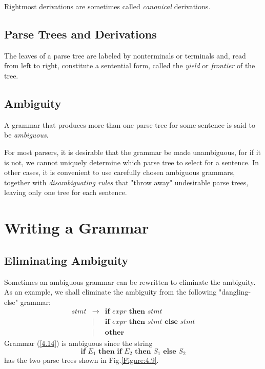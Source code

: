 \documentclass[a4paper,twoside]{book}
\begin{document}
Rightmost derivations are sometimes called \textit{canonical} derivations.

\subsection{Parse Trees and Derivations}

The leaves of a parse tree are labeled by nonterminals or terminals and, read from left to right, constitute a sentential form, called the \textit{yield} or \textit{frontier} of the tree.

\subsection{Ambiguity}

A grammar that produces more than one parse tree for some sentence is said to be \textit{ambiguous}.

For most parsers, it is desirable that the grammar be made unambiguous, for if it is not, we cannot uniquely determine which parse tree to select for a sentence. In other cases, it is convenient to use carefully chosen ambiguous grammars, together with \textit{disambiguating rules} that "throw away" undesirable parse trees, leaving only one tree for each sentence.

\section{Writing a Grammar}
\subsection{Eliminating Ambiguity}

Sometimes an ambiguous grammar can be rewritten to eliminate the ambiguity. As an example, we shall eliminate the ambiguity from the following "dangling-else" grammar:
\begin{equation}
    \begin{array}{ccl}stmt&\rightarrow&\textbf{if }expr\textbf{ then }stmt\\&|&\textbf{if }expr\textbf{ then }stmt\textbf{ else }stmt\\&|&\textbf{other}\end{array}
    \label{4.14}
\end{equation}
Grammar (\ref{4.14}) is ambiguous since the string
\begin{equation}
    \textbf{if }E_1\textbf{ then if }E_2\textbf{ then }S_1\textbf{ else }S_2
    \label{4.15}
\end{equation}
has the two parse trees shown in Fig.\;\ref{Figure:4.9}.
\end{document}
